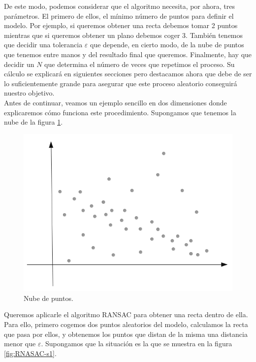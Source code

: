 De este modo, podemos considerar que el algoritmo necesita, por ahora, tres parámetros. El primero de ellos, el mínimo número de puntos para definir el modelo. Por ejemplo, si queremos obtener una recta debemos tomar 2 puntos mientras que si queremos obtener un plano debemos coger 3. También tenemos que decidir una tolerancia $ \varepsilon $ que depende, en cierto modo, de la nube de puntos que tenemos entre manos y del resultado final que queremos. Finalmente, hay que decidir un $ N $ que determina el número de veces que repetimos el proceso. Su cálculo se explicará en siguientes secciones pero destacamos ahora que debe de ser lo suficientemente grande para asegurar que este proceso aleatorio conseguirá nuestro objetivo. \\

Antes de continuar, veamos un ejemplo sencillo en dos dimensiones donde explicaremos cómo funciona este procedimiento. Supongamos que tenemos la nube de la figura \ref{fig:ejransac0}. \\

\begin{figure}[h!]
	\centering
	\includegraphics[width=0.5\linewidth]{imagenes/Ej-RANSAC/ejRANSAC_0}
	\caption{Nube de puntos.}
	\label{fig:ejransac0}
\end{figure}

Queremos aplicarle el algoritmo RANSAC para obtener una recta dentro de ella. Para ello, primero cogemos dos puntos aleatorios del modelo, calculamos la recta que pasa por ellos, y obtenemos los puntos que distan de la misma una distancia menor que $ \varepsilon $. Supongamos que la situación es la que se muestra en la figura \ref{fig:RNASAC-s1}. \\

